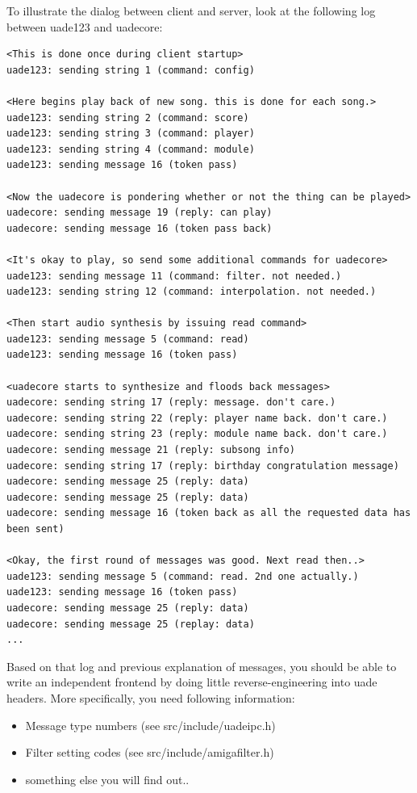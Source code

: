 \documentclass{article}
\begin{document}
To illustrate the dialog between client and server, look at the following log
between uade123 and uadecore:
\begin{verbatim}
<This is done once during client startup>
uade123: sending string 1 (command: config)

<Here begins play back of new song. this is done for each song.>
uade123: sending string 2 (command: score)
uade123: sending string 3 (command: player)
uade123: sending string 4 (command: module)
uade123: sending message 16 (token pass)

<Now the uadecore is pondering whether or not the thing can be played>
uadecore: sending message 19 (reply: can play)
uadecore: sending message 16 (token pass back)

<It's okay to play, so send some additional commands for uadecore>
uade123: sending message 11 (command: filter. not needed.)
uade123: sending string 12 (command: interpolation. not needed.)

<Then start audio synthesis by issuing read command>
uade123: sending message 5 (command: read)
uade123: sending message 16 (token pass)

<uadecore starts to synthesize and floods back messages>
uadecore: sending string 17 (reply: message. don't care.)
uadecore: sending string 22 (reply: player name back. don't care.)
uadecore: sending string 23 (reply: module name back. don't care.)
uadecore: sending message 21 (reply: subsong info)
uadecore: sending string 17 (reply: birthday congratulation message)
uadecore: sending message 25 (reply: data)
uadecore: sending message 25 (reply: data)
uadecore: sending message 16 (token back as all the requested data has been sent)

<Okay, the first round of messages was good. Next read then..>
uade123: sending message 5 (command: read. 2nd one actually.)
uade123: sending message 16 (token pass)
uadecore: sending message 25 (reply: data)
uadecore: sending message 25 (replay: data)
...
\end{verbatim}

Based on that log and previous explanation of messages, you should be able
to write an independent frontend by doing little reverse-engineering into
uade headers. More specifically, you need following information:
\begin{itemize}
\item Message type numbers (see \mbox{src/include/uadeipc.h})
\item Filter setting codes (see \mbox{src/include/amigafilter.h})
\item something else you will find out..
\end{itemize}
\end{document}
